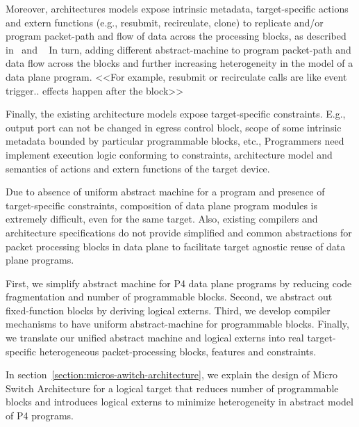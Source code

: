 \documentclass{hotnets19}
\begin{document}
Moreover, architectures models expose intrinsic metadata, target-specific actions and extern functions (e.g., resubmit, recirculate, clone) to replicate and/or program packet-path and flow of data across the processing blocks, as described in~\cite{simple_switch.md} and ~\cite{psa}
In turn, adding different abstract-machine to program packet-path and data flow across the blocks and further increasing heterogeneity in the model of a data plane program.
<<For example, resubmit or recirculate calls are like event trigger.. effects happen after the block>>

Finally, the existing architecture models expose target-specific constraints.
E.g., output port can not be changed in egress control block, scope of some intrinsic metadata bounded by particular programmable blocks, etc.,  
Programmers need implement execution logic conforming to constraints, architecture model and semantics of actions and extern functions of the target device.


Due to absence of uniform abstract machine for a program and presence of target-specific constraints, composition of data plane program modules is extremely difficult, even for the same target. 
Also, existing compilers and architecture specifications do not provide simplified and common abstractions for packet processing blocks in data plane to facilitate target agnostic reuse of data plane programs.


First, we simplify abstract machine for P4 data plane programs by reducing code fragmentation and number of programmable blocks.
Second, we abstract out fixed-function blocks by deriving logical externs.
Third, we develop compiler mechanisms to have uniform abstract-machine for programmable blocks.
Finally, we translate our unified abstract machine and logical externs into real target-specific heterogeneous packet-processing blocks, features and constraints.

In section~\ref{section:micros-awitch-architecture}, we explain the design of Micro Switch Architecture for a logical target that reduces number of programmable blocks and introduces logical externs to minimize heterogeneity in abstract model of P4 programs.



\end{document}
